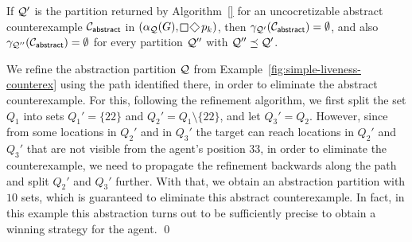 \begin{theorem}If $\mathcal{Q}'$ is the partition returned by Algorithm~\ref{} for an uncocretizable abstract counterexample $\mathcal{C}_{\mathsf{abstract}}$ in $(\alpha_\part(G),\LTLglobally\LTLfinally p_k)$, then $\gamma_{\mathcal{Q}'}(\mathcal{C}_{\mathsf{abstract}}) = \emptyset$, and also $\gamma_{\mathcal{Q}''}(\mathcal{C}_{\mathsf{abstract}}) = \emptyset$ for every partition $\mathcal{Q}''$ with $\mathcal{Q}'' \preceq \mathcal{Q}'$.
\end{theorem}

\begin{example}\label{ex:simple-liveness-refinement}
We refine the abstraction partition $\mathcal{Q}$ from Example~\ref{fig:simple-liveness-counterex} using the path identified there, in order to eliminate the abstract counterexample. For this, following the refinement algorithm, we first split the set $Q_1$ into sets $Q_1' = \{22\}$ and $Q_2' = Q_1 \setminus \{22\}$, and let $Q_3' = Q_2$. However, since from some locations in $Q_2'$ and in $Q_3'$ the target can reach locations in $Q_2'$ and $Q_3'$ that are not visible from the agent's position $33$, in order to eliminate the counterexample, we need to propagate the refinement backwards along the path and split $Q_2'$ and $Q_3'$ further. With that, we obtain an abstraction partition with $10$ sets, which is guaranteed to eliminate this abstract counterexample. In fact, in this example this abstraction turns out to be sufficiently precise to obtain a winning strategy for the agent.
\qed
\end{example}
